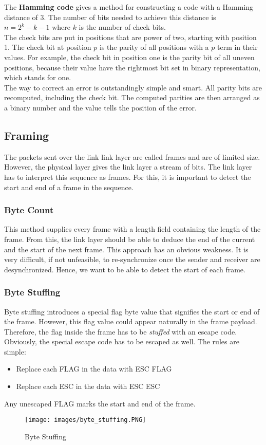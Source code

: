 The \textbf{Hamming code} gives a method for constructing a code with a Hamming distance of 3. The number of bits needed to achieve this distance is $n = 2^k - k - 1$ where $k$ is the number of check bits.\\
The check bits are put in positions that are power of two, starting with position 1. The check bit at position $p$ is the parity of all positions with a $p$ term in their values. For example, the check bit in position one is the parity bit of all uneven positions, because their value have the rightmost bit set in binary representation, which stands for one.\\
The way to correct an error is outstandingly simple and smart. All parity bits are recomputed, including the check bit. The computed parities are then arranged as a binary number and the value tells the position of the error.

\subsection{Framing}
The packets sent over the link link layer are called frames and are of limited size. However, the physical layer gives the link layer a stream of bits. The link layer has to interpret this sequence as frames. For this, it is important to detect the start and end of a frame in the sequence. 

\subsubsection{Byte Count}
This method supplies every frame with a length field containing the length of the frame. From this, the link layer should be able to deduce the end of the current and the start of the next frame. This approach has an obvious weakness. It is very difficult, if not unfeasible, to re-synchronize once the sender and receiver are desynchronized. Hence, we want to be able to detect the start of each frame.

\subsubsection{Byte Stuffing}
Byte stuffing introduces a special flag byte value that signifies the start or end of the frame. However, this flag value could appear naturally in the frame payload. Therefore, the flag inside the frame has to be \textit{stuffed} with an escape code. Obviously, the special escape code has to be escaped as well. The rules are simple:
\begin{itemize}
\item Replace each FLAG in the data with ESC FLAG
\item Replace each ESC in the data with ESC ESC
\end{itemize}
Any unescaped FLAG marks the start and end of the frame.
\begin{figure}[H]
\centering
\texttt{[image: images/byte\_stuffing.PNG]}
\label{byte_stuffing}
\caption{Byte Stuffing}
\end{figure}

